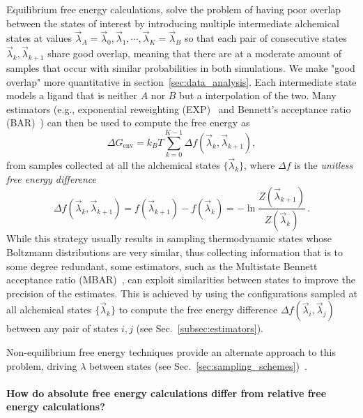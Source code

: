 \documentclass[9pt,bestpractices]{livecoms}
\begin{document}
Equilibrium free energy calculations, solve the problem of having poor overlap between the states of interest by introducing multiple intermediate alchemical states at values $\vec{\lambda}_A = \vec{\lambda}_0, \vec{\lambda}_1, \cdots, \vec{\lambda}_K = \vec{\lambda}_B$ so that each pair of consecutive states $\vec{\lambda}_k, \vec{\lambda}_{k+1}$ share good overlap, meaning that there are at a moderate amount of samples that occur with similar probabilities in both simulations.  We make "good overlap" more quantitative in section~\ref{sec:data_analysis}. 
Each intermediate state models a ligand that is neither $A$ nor $B$ but a interpolation of the two.
Many estimators (e.g., exponential reweighting (EXP)~\cite{zwanzig1954hightemperature} and Bennett's acceptance ratio (BAR)~\cite{bennett1976efficient,shirts2003equilibrium}) can then be used to compute the free energy as
\begin{equation}
    \Delta G_{\mathrm{env}} = k_BT \sum_{k=0}^{K-1} \Delta f(\vec{\lambda}_k, \vec{\lambda}_{k+1}),
\end{equation}
from samples collected at all the alchemical states $\{\vec{\lambda}_k \}$, where $\Delta f$ is the \emph{unitless free energy difference}
\begin{equation}
    \Delta f(\vec{\lambda}_k, \vec{\lambda}_{k+1}) = f(\vec{\lambda}_{k+1}) - f(\vec{\lambda}_k) = - \ln \frac{Z(\vec{\lambda}_{k+1})}{Z(\vec{\lambda}_k)} \, .
\end{equation}
While this strategy usually results in sampling thermodynamic states whose Boltzmann distributions are very similar, thus collecting information that is to some degree redundant, some estimators, such as the Multistate Bennett acceptance ratio (MBAR)~\cite{shirts2008statisticallya}, can exploit similarities between states to improve the precision of the estimates. This is achieved by using the configurations sampled at all alchemical states $\{\vec{\lambda}_k \}$ to compute the free energy difference $\Delta f(\vec{\lambda}_i, \vec{\lambda}_{j})$ between any pair of states $i,j$ (see Sec.~\ref{subsec:estimators}).

Non-equilibrium free energy techniques provide an alternate approach to this problem, driving $\lambda$ between states (see Sec.~\ref{sec:sampling_schemes})~\cite{jarzynski1997nonequilibrium,jarzynski1998equilibrium,crooks2000pathensemble, gapsys2020large}.

\paragraph{How do absolute free energy calculations differ from relative free energy calculations?}
\end{document}
